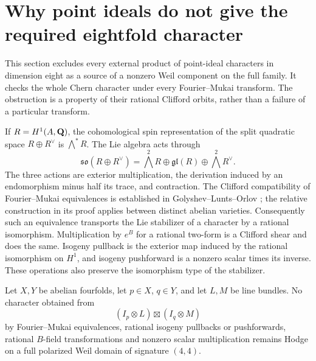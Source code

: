 \section{Why point ideals do not give the required eightfold character}
\label{sec:spin-obstructions}
This section excludes every external product of point-ideal characters in dimension eight as a source of a nonzero Weil component on the full family. It checks the whole Chern character under every Fourier--Mukai transform. The obstruction is a property of their rational Clifford orbits, rather than a failure of a particular transform.

If $R=H^1(A,\mathbf Q)$, the cohomological spin representation of the split quadratic space $R\oplus R^\vee$ is $\bigwedge^*R$. The Lie algebra acts through
\begin{equation}\label{eq:spin-lie-action}
 \mathfrak{so}(R\oplus R^\vee)
 =\bigwedge^2R\oplus\mathfrak{gl}(R)\oplus\bigwedge^2R^\vee.
\end{equation}
The three actions are exterior multiplication, the derivation induced by an endomorphism minus half its trace, and contraction. The Clifford compatibility of Fourier--Mukai equivalences is established in Golyshev--Lunts--Orlov \cite[\S3 and Proposition~4.3.7, author pp.~17--19]{GLO}; the relative construction in its proof applies between distinct abelian varieties. Consequently such an equivalence transports the Lie stabilizer of a character by a rational isomorphism. Multiplication by $e^B$ for a rational two-form is a Clifford shear and does the same. Isogeny pullback is the exterior map induced by the rational isomorphism on $H^1$, and isogeny pushforward is a nonzero scalar times its inverse. These operations also preserve the isomorphism type of the stabilizer.

\begin{proposition}\label{prop:point-product-spin}
Let $X,Y$ be abelian fourfolds, let $p\in X$, $q\in Y$, and let $L,M$ be line bundles. No character obtained from
\[
 (I_p\otimes L)\boxtimes(I_q\otimes M)
\]
by Fourier--Mukai equivalences, rational isogeny pullbacks or pushforwards, rational $B$-field transformations and nonzero scalar multiplication remains Hodge on a full polarized Weil domain of signature $(4,4)$.
\end{proposition}

